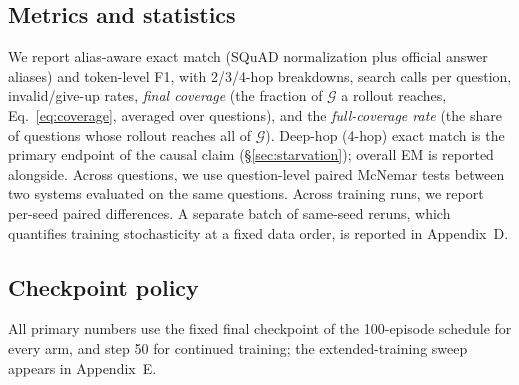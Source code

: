 \subsection{Metrics and statistics}
\label{sec:setup-metrics}

We report alias-aware exact match (SQuAD normalization plus official
answer aliases) and token-level F1, with 2/3/4-hop breakdowns, search
calls per question, invalid/give-up rates, \emph{final coverage} (the
fraction of $\mathcal{G}$ a rollout reaches, Eq.~\ref{eq:coverage},
averaged over questions), and the \emph{full-coverage rate} (the share
of questions whose rollout reaches all of $\mathcal{G}$). Deep-hop
(4-hop) exact match is the primary endpoint of the causal claim
(\S\ref{sec:starvation}); overall EM is reported alongside. Across
questions, we use question-level paired McNemar tests between two
systems evaluated on the same questions. Across training runs, we
report per-seed paired differences. A separate batch of same-seed
reruns, which quantifies training stochasticity at a fixed data order,
is reported in Appendix~D.

\subsection{Checkpoint policy}
\label{sec:setup-checkpoint}

All primary numbers use the fixed final checkpoint of the 100-episode
schedule for every arm, and step 50 for continued training; the
extended-training sweep appears in Appendix~E.


